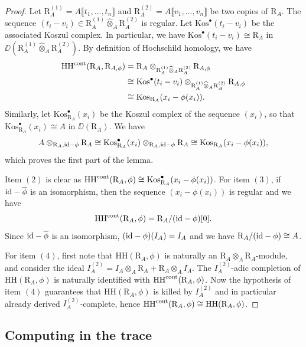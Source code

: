 \documentclass[a4paper, 10pt, oneside, reqno]{amsart}
\theoremstyle{plain}
\theoremstyle{definition}
\theoremstyle{remark}
\newcommand{\RR}{\mathrm{R}}
\newcommand{\HHH}{\mathrm{HH}}
\newcommand{\Kos}{\mathrm{Kos}}
\begin{document}
\begin{proof}
Let $\RR_A^{(1)} = A\llbracket t_1, \dots, t_n\rrbracket$ and $\RR_A^{(2)} = A\llbracket v_1, \dots, v_n\rrbracket$ be two copies of $\RR_A$. The sequence $(t_i - v_i) \in \RR_A^{(1)} \widehat{\otimes}_A \RR_A^{(2)}$ is regular. Let $\Kos^{\bullet}(t_i - v_i)$ be the associated Koszul complex. In particular, we have $\Kos^{\bullet}(t_i - v_i) \cong \RR_A$ in $\DD(\RR_A^{(1)} \widehat{\otimes}_A \RR_A^{(2)})$. By definition of Hochschild homology, we have 
\begin{align*}
\HHH^{\cont}(\RR_A, \RR_{A, \phi}) &= \RR_A \otimes_{\RR_A^{(1)} \widehat{\otimes}_A \RR_A^{(2)}} \RR_{A,\phi} \\ 
&\cong \Kos^{\bullet}(t_i - v_i) \otimes_{\RR_A^{(1)} \widehat{\otimes}_A \RR_A^{(2)}} \RR_{A, \phi} \\
&\cong \Kos_{\RR_A}(x_i - \phi(x_i)).
\end{align*}
Similarly, let $\Kos^{\bullet}_{\RR_A}(x_i)$ be the Koszul complex of the sequence $(x_i)$, so that $\Kos^{\bullet}_{\RR_A}(x_i) \cong A$ in $\DD(\RR_A)$. We have 
$$A \otimes_{\RR_A, \id - \phi} \RR_A \cong \Kos^{\bullet}_{\RR_A}(x_i) \otimes_{\RR_A,\id - \phi} \RR_A \cong \Kos_{\RR_A}(x_i - \phi(x_i)),$$
which proves the first part of the lemma.

Item $(2)$ is clear as $\HHH^{\cont}(\RR_A, \phi) \cong \Kos^{\bullet}_{\RR_A}(x_i - \phi(x_i))$. For item $(3)$, if $\mathrm{id} - \overline{\phi}$ is an isomorphism, then the sequence $(x_i - \phi(x_i))$ is regular and we have 
$$\HHH^{\cont}(\RR_A, \phi) = \RR_A/(\id - \phi)[0].$$
Since $\mathrm{id} - \overline{\phi}$ is an isomorphism, $(\mathrm{id} - \phi)(I_A) = I_A$ and we have $\RR_A/(\id - \phi) \cong A$. 

For item $(4)$, first note that $\HHH(\RR_A, \phi)$ is naturally an $\RR_A \otimes_A \RR_A$-module, and consider the ideal $I_A^{(2)} = I_A \otimes_A \RR_A + \RR_A \otimes_A I_A$. The $I_A^{(2)}$-adic completion of $\HHH(\RR_A, \phi)$ is naturally identified with $\HHH^{\cont}(\RR_A, \phi)$. Now the hypothesis of item $(4)$ guarantees that $\HHH(\RR_A, \phi)$ is killed by $I_A^{(2)}$ and in particular already derived $I_A^{(2)}$-complete, hence $\HHH^{\cont}(\RR_A, \phi) \cong \HHH(\RR_A, \phi)$. 
\end{proof}

\subsection{Computing in the trace}
\end{document}
